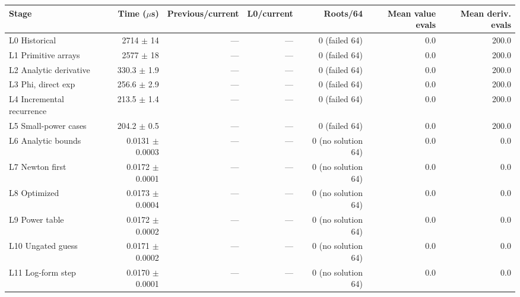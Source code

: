 \begin{tabular}{lrrrrrr}
\toprule
Stage & Time ($\mu$s) & Previous/current & L0/current & Roots/64 & Mean value evals & Mean deriv. evals \\
\midrule
L0 Historical & 2714 $\pm$ 14 & --- & --- & 0 (failed 64) & 0.0 & 200.0 \\
L1 Primitive arrays & 2577 $\pm$ 18 & --- & --- & 0 (failed 64) & 0.0 & 200.0 \\
L2 Analytic derivative & 330.3 $\pm$ 1.9 & --- & --- & 0 (failed 64) & 0.0 & 200.0 \\
L3 Phi, direct exp & 256.6 $\pm$ 2.9 & --- & --- & 0 (failed 64) & 0.0 & 200.0 \\
L4 Incremental recurrence & 213.5 $\pm$ 1.4 & --- & --- & 0 (failed 64) & 0.0 & 200.0 \\
L5 Small-power cases & 204.2 $\pm$ 0.5 & --- & --- & 0 (failed 64) & 0.0 & 200.0 \\
L6 Analytic bounds & 0.0131 $\pm$ 0.0003 & --- & --- & 0 (no solution 64) & 0.0 & 0.0 \\
L7 Newton first & 0.0172 $\pm$ 0.0001 & --- & --- & 0 (no solution 64) & 0.0 & 0.0 \\
L8 Optimized & 0.0173 $\pm$ 0.0004 & --- & --- & 0 (no solution 64) & 0.0 & 0.0 \\
L9 Power table & 0.0172 $\pm$ 0.0002 & --- & --- & 0 (no solution 64) & 0.0 & 0.0 \\
L10 Ungated guess & 0.0171 $\pm$ 0.0002 & --- & --- & 0 (no solution 64) & 0.0 & 0.0 \\
L11 Log-form step & 0.0170 $\pm$ 0.0001 & --- & --- & 0 (no solution 64) & 0.0 & 0.0 \\
\bottomrule
\end{tabular}

